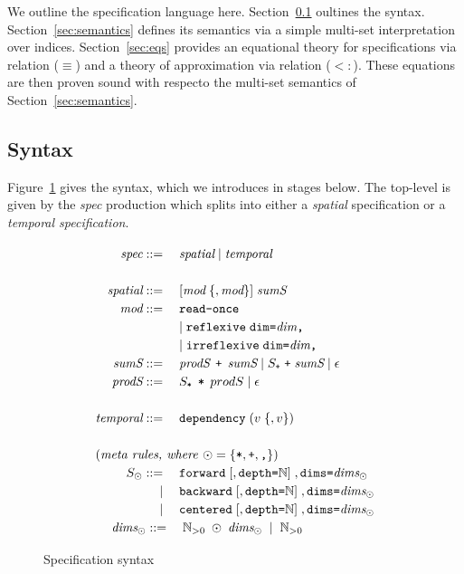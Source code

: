 \documentclass[9pt]{sigplanconf}
\theoremstyle{definition}
\begin{document}
We outline the specification language here. Section~\ref{sec:syntax}
oultines the syntax. Section~\ref{sec:semantics} defines its semantics
via a simple multi-set interpretation over indices. Section~\ref{sec:eqs} provides an
equational theory for specifications via relation ($\equiv$) and a
theory of approximation via relation ($<:$). These equations are then
proven sound with respecto the multi-set semantics of Section~\ref{sec:semantics}.

\subsection{Syntax}
\label{sec:syntax}

Figure~\ref{fig:syntax}
gives the syntax, which we introduces in stages below.
The top-level is given by the \textit{spec} production
which splits into either a \textit{spatial} specification or
a \textit{temporal specification}.

\begin{figure}[t]
\begin{align*}
\def\arraystretch{1.2}
\begin{array}{rl}
\textit{spec} ::= \; & \textit{spatial} \mid \textit{temporal}   \\ \\
\textit{spatial} ::= \; & [\textit{mod} \; \{, \textit{mod} \}] \; \textit{sumS} \\
\textit{mod} ::= \; &
 \texttt{read-once} \\
& \mid \texttt{reflexive} \; \texttt{dim=}\textit{dim}{\texttt{,}} \\
& \mid \texttt{irreflexive} \; \texttt{dim=}\textit{dim}{\texttt{,}} \\
\textit{sumS} ::= \; & \textit{prodS} \;\, \texttt{+} \;\, \textit{sumS} \mid S_{\texttt{+}} \; \texttt{+}
          \; \textit{sumS} \mid \epsilon \\
\textit{prodS} ::= \; & S_{\texttt{*}}  \;\, \texttt{*} \;\, prodS
                        \mid \epsilon \\ \\
\textit{temporal} ::= \; & \texttt{dependency} \; (v \; \{ , v \})  \\ \\
\multicolumn{2}{l}{(\textit{meta rules, where \textnormal{$\odot = \{\texttt{*}, \texttt{+}, \texttt{,}\}$}})} \\
S_\odot ::= \; & \texttt{forward} \; [,\texttt{depth=}\mathbb{N}] \;
        , \texttt{dims=}\textit{dims}_\odot  \\
\mid \; & \texttt{backward} \; [,\texttt{depth=}\mathbb{N}] \; , \texttt{dims=}\textit{dims}_\odot \\
\mid \; & \texttt{centered} \; [,\texttt{depth=}\mathbb{N}] \; ,
          \texttt{dims=}\textit{dims}_\odot \\
\textit{dims}_\odot ::= & \; \mathbb{N}_{>0} \; \odot \;
                          \textit{dims}_{\odot} \; \mid \;
                          \mathbb{N}_{> 0}
\end{array}
\end{align*}
\caption{Specification syntax}
\label{fig:syntax}
\end{figure}
\end{document}
